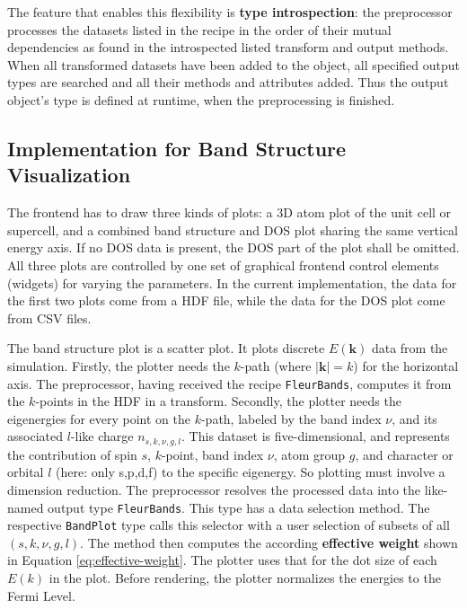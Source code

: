 The feature that enables this flexibility is \textbf{type introspection}: the
preprocessor processes the datasets listed in the recipe in the order of their
mutual dependencies as found in the introspected listed transform and output
methods. When all transformed datasets have been added to the object, all
specified output types are searched and all their methods and attributes added.
Thus the output object's type is defined at runtime, when the preprocessing is
finished.


% 


\subsection{Implementation for Band Structure Visualization}
\label{sec:preprocessor-implementation}

The frontend has to draw three kinds of plots: a 3D atom plot of the unit cell
or supercell, and a combined band structure and DOS plot sharing the same
vertical energy axis. If no DOS data is present, the DOS part of the plot shall
be omitted. All three plots are controlled by one set of graphical frontend
control elements (widgets) for varying the parameters. In the current
implementation, the data for the first two plots come from a HDF file, while the
data for the DOS plot come from CSV files.

The band structure plot is a scatter plot. It plots discrete \(E(\mathbf{k})\)
data from the simulation. Firstly, the plotter needs the \(k\)-path (where
\(|\mathbf{k}|=k\)) for the horizontal axis. The preprocessor, having received
the recipe \texttt{FleurBands}, computes it from the \(k\)-points in the HDF in
a transform. Secondly, the plotter needs the eigenergies for every point on the
\(k\)-path, labeled by the band index \(\nu\), and its associated \(l\)-like
charge \(n_{s,k,\nu,g,l}\). This dataset is five-dimensional, and represents the
contribution of spin \(s\), \(k\)-point, band index \(\nu\),
atom group \(g\), and character or orbital \(l\) (here: only s,p,d,f) to the
specific eigenergy. So plotting must involve a dimension reduction. The
preprocessor resolves the processed data into the like-named output type
\texttt{FleurBands}. This type has a data selection method. The respective
\texttt{BandPlot} type calls this selector with a user selection of subsets of
all \((s,k,\nu,g,l)\). The method then computes the according \textbf{effective
  weight} shown in Equation \ref{eq:effective-weight}. The plotter uses that for
the dot size of each \(E(k)\) in the plot. Before rendering, the plotter
normalizes the energies to the Fermi Level.

